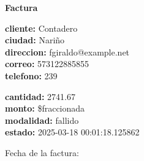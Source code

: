 \documentclass{article}
\begin{document}
\begin{center}
    {\LARGE \textbf{Factura}}\\[1cm]
\end{center}

\textbf{cliente:} Contadero \\
\textbf{ciudad:} Nariño \\
\textbf{direccion:} fgiraldo@example.net \\
\textbf{correo:} 573122885855 \\
\textbf{telefono:} 239 \\

\vspace{0.5cm}

\textbf{cantidad:} 2741.67 \\
\textbf{monto:} \$fraccionada \\
\textbf{modalidad:} fallido \\
\textbf{estado:} 2025-03-18 00:01:18.125862 \\

\vspace{1cm}

Fecha de la factura: 
\end{document}
